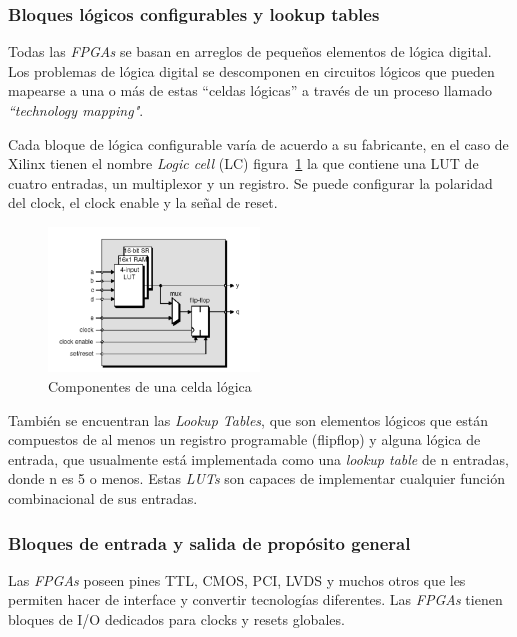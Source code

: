	
\subsubsection{Bloques lógicos configurables y lookup tables}

Todas las \textit{FPGAs} se basan en arreglos de pequeños elementos de
lógica digital. Los problemas de lógica digital se descomponen en
circuitos lógicos que pueden mapearse a una o más de estas
``celdas lógicas'' a través de un proceso llamado \textit{“technology
  mapping"}.
	
Cada bloque de lógica configurable varía de acuerdo a su fabricante,
en el caso de Xilinx tienen el nombre \textit{Logic cell} (LC) figura~\ref{fig:complc} la que contiene una LUT de cuatro entradas, un multiplexor
y un registro. Se puede configurar la polaridad del clock, el clock
enable y la señal de reset.

\begin{figure}[h!]
\begin{center}
\includegraphics[width=0.5\textwidth,keepaspectratio=true]{./images/celda}
\caption{Componentes de una celda lógica}
\label{fig:complc}
\end{center}
\end{figure}

También se encuentran las \textit{Lookup Tables}, que son elementos
lógicos que están compuestos de al menos un registro programable
(flip\-flop) y alguna lógica de entrada, que usualmente está
implementada como una \textit{lookup table} de n entradas, donde n es
5 o menos. Estas \textit{LUTs} son capaces de implementar cualquier
función combinacional de sus entradas.

\subsubsection{Bloques de entrada y salida de propósito general}

Las \textit{FPGAs} poseen pines TTL, CMOS, PCI, LVDS y muchos otros
que les permiten hacer de interface y convertir tecnologías
diferentes. Las \textit{FPGAs} tienen bloques de I/O dedicados para
clocks y resets globales.
	

